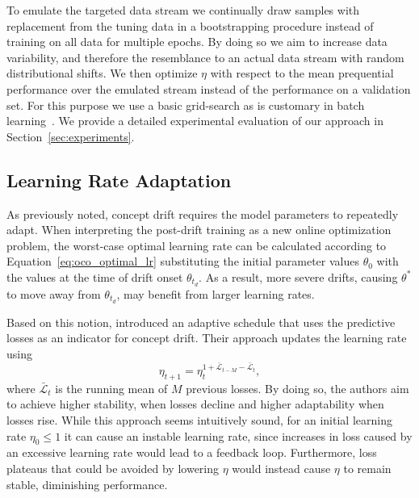 \documentclass[runningheads]{llncs}
\begin{document}
To emulate the targeted data stream we continually draw samples with replacement from the tuning data in a bootstrapping procedure instead of training on all data for multiple epochs.
By doing so we aim to increase data variability, and therefore the resemblance to an actual data stream with random distributional shifts.
We then optimize $\eta$ with respect to the mean prequential performance over the emulated stream instead of the performance on a validation set.
For this purpose we use a basic grid-search as is customary in batch learning~\cite{defazioLearningRateFreeLearningDAdaptation2023a}.
We provide a detailed experimental evaluation of our approach in Section~\ref{sec:experiments}.

\subsection{Learning Rate Adaptation}

As previously noted, concept drift requires the model parameters to repeatedly adapt.
When interpreting the post-drift training as a new online optimization problem, the worst-case optimal learning rate can be calculated according to Equation~\ref{eq:oco_optimal_lr} substituting the initial parameter values $\theta_0$ with the values at the time of drift onset $\theta_{t_d}$.
As a result, more severe drifts, causing $\theta^*$ to move away from $\theta_{t_d}$, may benefit from larger learning rates.

Based on this notion, \textcite{kunchevaAdaptiveLearningRate2008} introduced an adaptive schedule that uses the predictive losses as an indicator for concept drift.
Their approach updates the learning rate using
\begin{equation}
	\eta_{t+1} = \eta_t^{1+	\bar{\mathcal{L}}_{t-M} - \bar{\mathcal{L}}_{t}},
\end{equation}\label{eq:kuncheva_lr}
where $\bar{\mathcal{L}}_{t}$ is the running mean of $M$ previous losses.
By doing so, the authors aim to achieve higher stability, when losses decline and higher adaptability when losses rise.
While this approach seems intuitively sound, for an initial learning rate $\eta_0 \leq 1$ it can cause an instable learning rate, since increases in loss caused by an excessive learning rate would lead to a feedback loop.
Furthermore, loss plateaus that could be avoided by lowering $\eta$ would instead cause $\eta$ to remain stable, diminishing performance.
\end{document}
